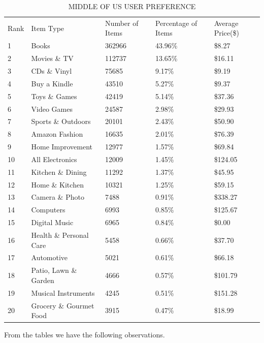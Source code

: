 \begin{table}[!htbp]
\centering
\caption{MIDDLE OF US USER PREFERENCE}
\label{tb:mid}
\begin{adjustbox}{max width=.5\textwidth}
\begin{tabular}{lllll}
Rank & Item Type          & Number of Items & Percentage of Items & Average Price(\$) \\
1 & Books & 362966 & 43.96\% & \$8.27 \\
2 & Movies \& TV & 112737 & 13.65\% & \$16.11 \\
3 & CDs \& Vinyl & 75685 & 9.17\% & \$9.19 \\
4 & Buy a Kindle & 43510 & 5.27\% & \$9.37 \\
5 & Toys \& Games & 42419 & 5.14\% & \$37.36 \\
6 & Video Games & 24587 & 2.98\% & \$29.93 \\
7 & Sports \& Outdoors & 20101 & 2.43\% & \$50.90 \\
8 & Amazon Fashion & 16635 & 2.01\% & \$76.39 \\
9 & Home Improvement & 12977 & 1.57\% & \$69.84 \\
10 & All Electronics & 12009 & 1.45\% & \$124.05 \\
11 & Kitchen \& Dining & 11292 & 1.37\% & \$45.95 \\
12 & Home \& Kitchen & 10321 & 1.25\% & \$59.15 \\
13 & Camera \& Photo & 7488 & 0.91\% & \$338.27 \\
14 & Computers & 6993 & 0.85\% & \$125.67 \\
15 & Digital Music & 6965 & 0.84\% & \$0.00 \\
16 & Health \& Personal Care & 5458 & 0.66\% & \$37.70 \\
17 & Automotive & 5021 & 0.61\% & \$66.18 \\
18 & Patio, Lawn \& Garden & 4666 & 0.57\% & \$101.79 \\
19 & Musical Instruments & 4245 & 0.51\% & \$151.28 \\
20 & Grocery \& Gourmet Food & 3915 & 0.47\% & \$18.99 \\
\end{tabular}
\end{adjustbox}
\end{table}

From the tables we have the following observations.

